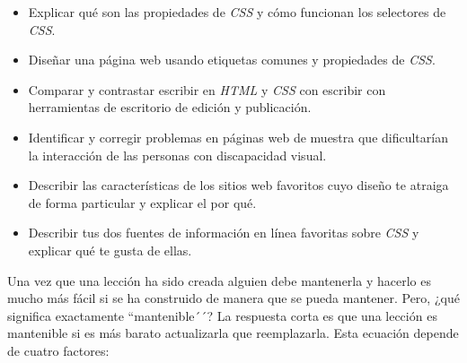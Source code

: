\begin{itemize}
 
\item
  Explicar qué son las propiedades de \emph{CSS} y cómo funcionan los selectores de \emph{CSS}.
 
\item
  Diseñar una página web usando etiquetas comunes y propiedades de \emph{CSS}.
 
\item
 Comparar y contrastar escribir en \emph{HTML} y \emph{CSS}
 con escribir con herramientas de escritorio de edición y publicación.
 
\item
  Identificar y corregir problemas en páginas web de muestra
  que dificultarían la interacción de las personas con discapacidad visual.
 
\item
 Describir las características de los sitios web favoritos
 cuyo diseño te atraiga de forma particular
 y explicar el por qué.
 
\item
  Describir tus dos fuentes de información en línea favoritas sobre
  \emph{CSS} y explicar qué te gusta de ellas.
 
\end{itemize}
 
 
Una vez que una lección ha sido creada alguien debe mantenerla
y hacerlo es mucho más fácil si se ha construido de manera que se pueda mantener.
Pero, ¿qué significa exactamente ``mantenible´´? 
La respuesta corta es que una lección es mantenible
si es más barato actualizarla que reemplazarla.
Esta ecuación depende de cuatro factores:
 
